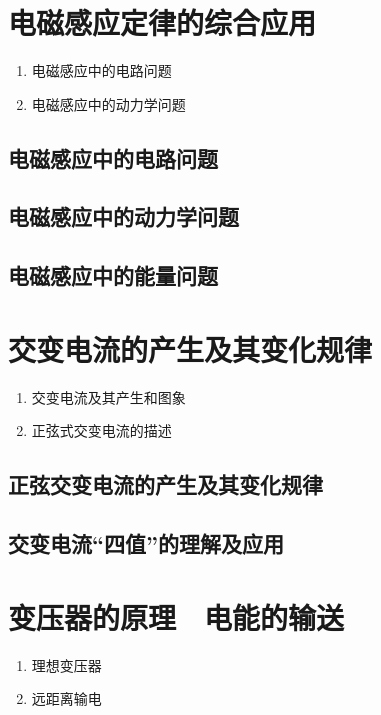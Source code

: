 \documentclass[cn,11pt,mac, simple]{elegantbook}
\begin{document}
\chapter{电磁感应定律的综合应用}
\begin{enumerate}
   \item 电磁感应中的电路问题
   \item 电磁感应中的动力学问题
\end{enumerate}

\clearpage\section{电磁感应中的电路问题}

\clearpage\section{电磁感应中的动力学问题}

\clearpage\section{电磁感应中的能量问题}

\chapter{交变电流的产生及其变化规律}
\begin{enumerate}
   \item 交变电流及其产生和图象
   \item 正弦式交变电流的描述
\end{enumerate}

\clearpage\section{正弦交变电流的产生及其变化规律}

\clearpage\section{交变电流“四值”的理解及应用}

\chapter{变压器的原理　电能的输送}
\begin{enumerate}
   \item 理想变压器
   \item 远距离输电
\end{enumerate}
\end{document}
